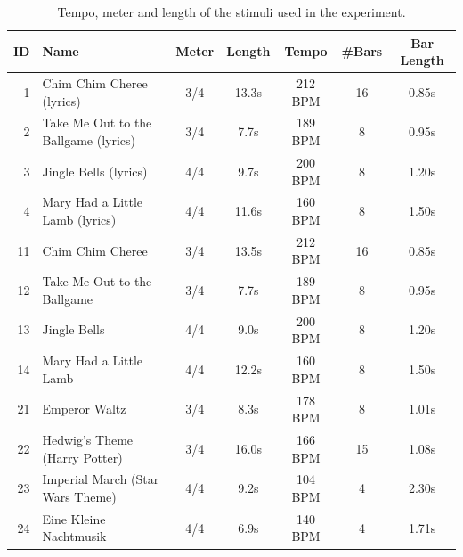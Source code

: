 \begin{table}[t]
\small
\centering
\caption{Tempo, meter and length of the stimuli used in the experiment.}
\label{tab:stimuli_information}
\begin{tabularx}{\columnwidth}{r l c c  c c c }
\toprule
ID		& Name							&Meter 	& Length	& Tempo 		&\#Bars	& Bar Length\\
\midrule
1		& Chim Chim Cheree (lyrics)			& 3/4		& 13.3s 			& 212 BPM 	& 16				& 0.85s	\\ 
2		& Take Me Out to the Ballgame (lyrics)	& 3/4		& 7.7s 			& 189 BPM 	& 8				& 0.95s	\\ 
3		& Jingle Bells (lyrics)					& 4/4		& 9.7s 			& 200 BPM 	& 8				& 1.20s	\\ 
4		& Mary Had a Little Lamb (lyrics)		& 4/4		& 11.6s			& 160 BPM 	& 8				& 1.50s	\\ 
11		& Chim Chim Cheree 				& 3/4		& 13.5s	 		& 212 BPM 	& 16				& 0.85s	\\ 
12		& Take Me Out to the Ballgame			& 3/4		& 7.7s 			& 189 BPM 	& 8				& 0.95s	\\ 
13		& Jingle Bells 						& 4/4		& 9.0s 			& 200 BPM 	& 8				& 1.20s	\\ 
14		& Mary Had a Little Lamb				& 4/4		& 12.2s			& 160 BPM 	& 8				& 1.50s	\\ 
21		& Emperor Waltz					& 3/4		& 8.3s 			& 178 BPM 	& 8				& 1.01s	\\ 
22		& Hedwig's Theme (Harry Potter)		& 3/4		& 16.0s	 		& 166 BPM 	& 15				& 1.08s	\\
23		& Imperial March (Star Wars Theme)		& 4/4		& 9.2s 			& 104 BPM 	& 4				& 2.30s	\\ 
24		& Eine Kleine Nachtmusik				& 4/4		& 6.9s			& 140 BPM 	& 4				& 1.71s	\\
\bottomrule
\end{tabularx}
\end{table}


